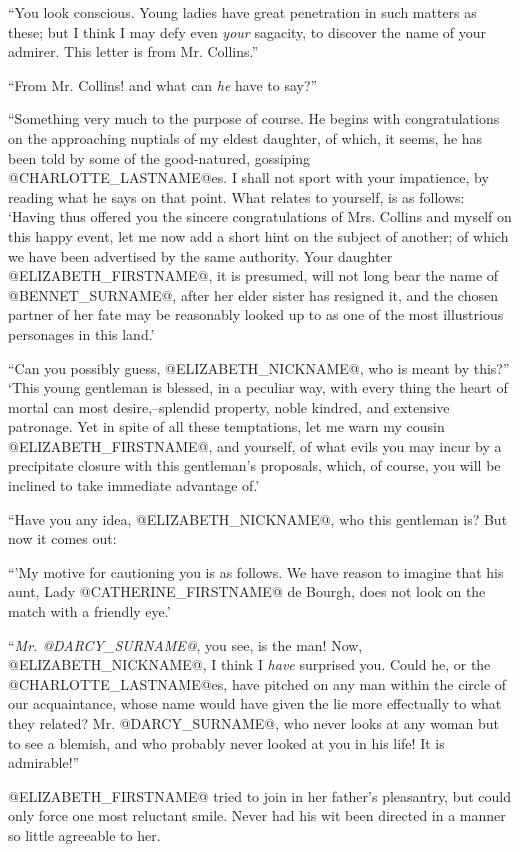 ``You look conscious. Young ladies have great penetration in such matters
as these; but I think I may defy even \textit{your} sagacity, to discover the
name of your admirer. This letter is from Mr. Collins.''

``From Mr. Collins! and what can \textit{he} have to say?''

``Something very much to the purpose of course. He begins with
congratulations on the approaching nuptials of my eldest daughter, of
which, it seems, he has been told by some of the good-natured, gossiping
@CHARLOTTE_LASTNAME@es. I shall not sport with your impatience, by reading what he says
on that point. What relates to yourself, is as follows: `Having thus
offered you the sincere congratulations of Mrs. Collins and myself on
this happy event, let me now add a short hint on the subject of another;
of which we have been advertised by the same authority. Your daughter
@ELIZABETH_FIRSTNAME@, it is presumed, will not long bear the name of @BENNET_SURNAME@, after
her elder sister has resigned it, and the chosen partner of her fate may
be reasonably looked up to as one of the most illustrious personages in
this land.'

``Can you possibly guess, @ELIZABETH_NICKNAME@, who is meant by this?'' `This young
gentleman is blessed, in a peculiar way, with every thing the heart of
mortal can most desire,--splendid property, noble kindred, and extensive
patronage. Yet in spite of all these temptations, let me warn my cousin
@ELIZABETH_FIRSTNAME@, and yourself, of what evils you may incur by a precipitate
closure with this gentleman's proposals, which, of course, you will be
inclined to take immediate advantage of.'

``Have you any idea, @ELIZABETH_NICKNAME@, who this gentleman is? But now it comes out:

``'My motive for cautioning you is as follows. We have reason to imagine
that his aunt, Lady @CATHERINE_FIRSTNAME@ de Bourgh, does not look on the match with
a friendly eye.'

``\textit{Mr. @DARCY_SURNAME@}, you see, is the man! Now, @ELIZABETH_NICKNAME@, I think I \textit{have}
surprised you. Could he, or the @CHARLOTTE_LASTNAME@es, have pitched on any man within
the circle of our acquaintance, whose name would have given the lie
more effectually to what they related? Mr. @DARCY_SURNAME@, who never looks at any
woman but to see a blemish, and who probably never looked at you in his
life! It is admirable!''

@ELIZABETH_FIRSTNAME@ tried to join in her father's pleasantry, but could only force
one most reluctant smile. Never had his wit been directed in a manner so
little agreeable to her.

